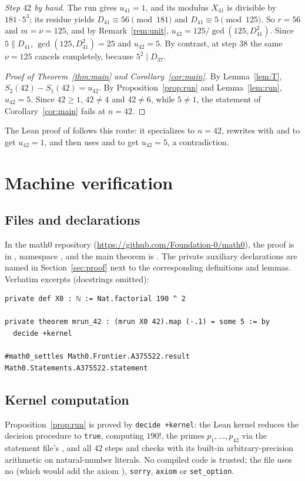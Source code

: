 \documentclass[11pt]{amsart}
\theoremstyle{plain}
\theoremstyle{definition}
\begin{document}
\emph{Step $42$ by hand.} The run gives $u_{41}=1$, and its modulus $X_{41}$ is divisible by $181\cdot 5^3$; its residue yields $D_{41}\equiv56\pmod{181}$ and $D_{41}\equiv5\pmod{125}$. So $r=56$ and $m=\nu=125$, and by Remark~\ref{rem:unit}, $u_{42}=125/\gcd(125,D_{41}^2)$. Since $5\parallel D_{41}$, $\gcd(125,D_{41}^2)=25$ and $u_{42}=5$. By contrast, at step $38$ the same $\nu=125$ cancels completely, because $5^2\mid D_{37}$.

\begin{proof}[Proof of Theorem~\ref{thm:main} and Corollary~\ref{cor:main}]
By Lemma~\ref{lem:T}, $S_2(42)-S_1(42)=u_{42}$. By Proposition~\ref{prop:run} and Lemma~\ref{lem:run}, $u_{42}=5$. Since $42\ge1$, $42\ne4$ and $42\ne6$, while $5\ne1$, the statement of Corollary~\ref{cor:main} fails at $n=42$.
\end{proof}

The Lean proof of  follows this route: it specializes  to $n=42$, rewrites with  and  to get $u_{42}=1$, and then uses  and  to get $u_{42}=5$, a contradiction.

\section{Machine verification}\label{sec:lean}

\subsection*{Files and declarations}
In the math0 repository (\url{https://github.com/Foundation-0/math0}), the proof is in , namespace , and the main theorem is . The private auxiliary declarations are named in Section~\ref{sec:proof} next to the corresponding definitions and lemmas. Verbatim excerpts (docstrings omitted):
\begin{lstlisting}
private def X0 : ℕ := Nat.factorial 190 ^ 2

private theorem mrun_42 : (mrun X0 42).map (·.1) = some 5 := by
  decide +kernel

#math0_settles Math0.Frontier.A375522.result Math0.Statements.A375522.statement
\end{lstlisting}

\subsection*{Kernel computation}
Proposition~\ref{prop:run} is proved by \texttt{decide +kernel}: the Lean kernel reduces the decision procedure to \texttt{true}, computing $190!$, the primes $p_1,\dots,p_{42}$ via the statement file's , and all $42$ steps and checks with its built-in arbitrary-precision arithmetic on natural-number literals. No compiled code is trusted; the file uses no  (which would add the axiom ), \texttt{sorry}, \texttt{axiom} or \texttt{set\_option}.
\end{document}
